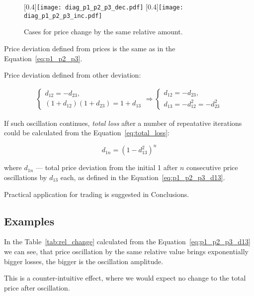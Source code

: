\documentclass[a4paper]{article}
\begin{document}
\begin{figure}[H]  %
\centering
\hfill  %
  [0.4\textwidth]{\texttt{[image: diag\_p1\_p2\_p3\_dec.pdf]}}
\hfill
{}
  [0.4\textwidth]{\texttt{[image: diag\_p1\_p2\_p3\_inc.pdf]}}
\hfill
\caption{Cases for price change by the same relative amount.}
\label{fig:diag_p1_p2_p3}
\end{figure}

Price deviation defined from prices is the same as in
the Equation~\ref{eq:p1_p2_p3}.

Price deviation defined from other deviation:

\begin{align}
  \begin{cases}
  d_{12} = -d_{23},\\
  (1 + d_{12})(1 + d_{23}) = 1 + d_{13}
  \end{cases}
  \Rightarrow
  \begin{cases}
    d_{12} = -d_{23},\\
    \boxed{d_{13} = -d_{12}^2 = -d_{23}^2}
  \end{cases}
  \label{eq:p1_p2_p3_d13}
\end{align}

If such oscillation continues, \emph{total loss} after a number of repeatative
iterations could be calculated from the Equation~\ref{eq:total_loss}:

\begin{equation}
  \boxed{d_{1n} = (1 - d_{13}^2)^n}
  \label{eq:total_loss}
\end{equation}

where $d_{1n}$ --- total price deviation from the initial 1
after $n$ consecutive price oscillations by $d_{13}$ each,
as defined in the Equation~\ref{eq:p1_p2_p3_d13}.

Practical application for trading is suggested in Conclusions.

\subsection*{Examples}

In the Table~\ref{tab:rel_change} calculated from
the Equation~\ref{eq:p1_p2_p3_d13} we can see, that price oscillation by the
same relative value brings exponentially bigger losses, the bigger is the
oscillation amplitude.

This is a counter-intuitive effect, where we would expect no change to
the total price after oscillation.
\end{document}
